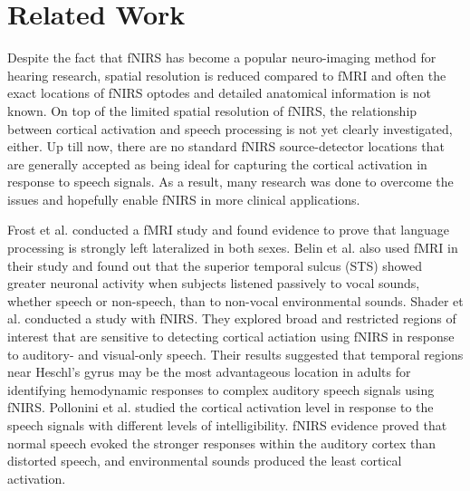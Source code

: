 \section{Related Work}


Despite the fact that fNIRS has become a popular neuro-imaging method for hearing research, spatial resolution is reduced compared to fMRI and often the exact locations of fNIRS optodes and detailed anatomical information is not known. On top of the limited spatial resolution of fNIRS, the relationship between cortical activation and speech processing is not yet clearly investigated, either. Up till now,  there are no standard fNIRS source-detector locations that are generally accepted as being ideal for capturing the cortical activation in response to speech signals. As a result, many research was done to overcome the issues and hopefully enable fNIRS in more clinical applications.

Frost et al. \citeyear {Frost1999-vs} conducted a fMRI study and found evidence to prove that language processing is strongly left lateralized in both sexes. Belin et al. \citeyear {Belin2000} also used fMRI in their study and found out that the superior temporal sulcus (STS) showed greater neuronal activity when subjects listened passively to vocal sounds, whether speech or non-speech, than to non-vocal environmental sounds. Shader et al. \citeyear {Shader2021} conducted a study with fNIRS. They explored broad and restricted regions of interest that are sensitive to detecting cortical actiation using fNIRS in response to auditory- and visual-only speech. Their results suggested that temporal regions near  Heschl's gyrus may be the most advantageous location in adults for identifying hemodynamic responses to complex auditory speech signals using fNIRS. Pollonini et al. \citeyear{Pollonini2013} studied the cortical activation level in response to the speech signals with different levels of intelligibility. fNIRS evidence proved that normal speech evoked the stronger responses within the auditory cortex than distorted speech, and environmental sounds produced the least cortical activation.



